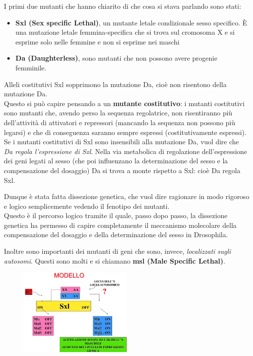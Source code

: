\documentclass[11pt]{book}
\begin{document}
I primi due mutanti che hanno chiarito di che cosa si stava parlando sono stati:
\begin{itemize}
\item \textbf{Sxl (Sex specific Lethal)}, un mutante letale condizionale sesso specifico. È una mutazione letale femmina-specifica che si trova sul cromosoma X e si esprime solo nelle femmine e non si esprime nei maschi
\item \textbf{Da (Daughterless)}, sono mutanti che non possono avere progenie femminile.
\end{itemize}

Alleli costitutivi Sxl sopprimono la mutazione Da, cioè non risentono della mutazione Da.\\
Questo si può capire pensando a un \textbf{mutante costitutivo}: i mutanti costitutivi sono mutanti che, avendo perso la sequenza regolatrice, non risentiranno più dell’attività di attivatori e repressori (mancando la sequenza non possono più legarsi) e che di conseguenza saranno sempre espressi (costitutivamente espressi).\\
Se i mutanti costitutivi di Sxl sono insensibili alla mutazione Da, vuol dire che \emph{Da regola l’espressione di Sxl}.
Nella via metabolica di regolazione dell’espressione dei geni legati al sesso (che poi influenzano la determinazione del sesso e la compensazione del dosaggio) Da si trova a monte rispetto a Sxl: cioè Da regola Sxl.

Dunque è stata fatta dissezione genetica, che vuol dire ragionare in modo rigoroso e logico semplicemente vedendo il fenotipo dei mutanti.\\
Questo è il percorso logico tramite il quale, passo dopo passo, la dissezione genetica ha permesso di capire completamente il meccanismo molecolare della compensazione del dosaggio e della determinazione del sesso in Drosophila.

Inoltre sono importanti dei mutanti di geni che sono, invece, \emph{localizzati sugli autosomi}. Questi sono molti e si chiamano \textbf{msl (Male Specific Lethal)}.

\begin{figure}
    \includegraphics[width=0.5\textwidth]{img/msl.png}
  \caption{}
\end{figure}
\end{document}
